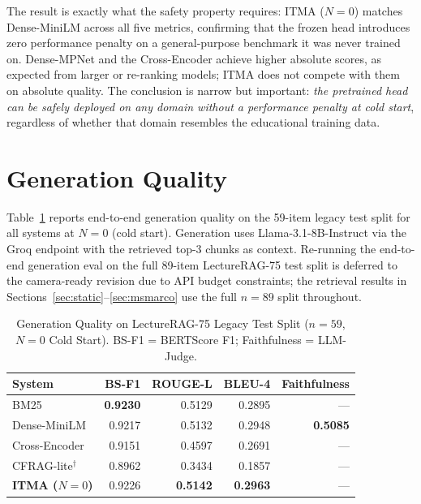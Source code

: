 \documentclass[journal]{IEEEtran}
\begin{document}
The result is exactly what the safety property requires: ITMA
($N{=}0$) matches Dense-MiniLM across all five metrics, confirming
that the frozen head introduces zero performance penalty on a
general-purpose benchmark it was never trained on.  Dense-MPNet and
the Cross-Encoder achieve higher absolute scores, as expected from
larger or re-ranking models; ITMA does not compete with them on
absolute quality.  The conclusion is narrow but important:
\emph{the pretrained head can be safely deployed on any domain without
a performance penalty at cold start}, regardless of whether that
domain resembles the educational training data.

\section{Generation Quality}
\label{sec:generation}

Table~\ref{tab:gen_quality} reports end-to-end generation quality on
the 59-item legacy test split for all systems at $N{=}0$ (cold start).
Generation uses Llama-3.1-8B-Instruct via the Groq endpoint with the
retrieved top-3 chunks as context.  Re-running the end-to-end generation
eval on the full 89-item LectureRAG-75 test split is deferred to the
camera-ready revision due to API budget constraints; the retrieval
results in Sections~\ref{sec:static}--\ref{sec:msmarco} use the full
$n{=}89$ split throughout.

\begin{table}[!htbp]
\centering
\caption{Generation Quality on LectureRAG-75 Legacy Test Split
($n{=}59$, $N{=}0$ Cold Start).  BS-F1 = BERTScore F1;
Faithfulness = LLM-Judge.}
\label{tab:gen_quality}
\small
\setlength{\tabcolsep}{4pt}
\begin{tabular}{lrrrr}
\toprule
System & BS-F1 & ROUGE-L & BLEU-4 & Faithfulness \\
\midrule
BM25 & \textbf{0.9230} & 0.5129 & 0.2895 & --- \\
Dense-MiniLM & 0.9217 & 0.5132 & 0.2948 & \textbf{0.5085} \\
Cross-Encoder & 0.9151 & 0.4597 & 0.2691 & --- \\
CFRAG-lite$^\dagger$ & 0.8962 & 0.3434 & 0.1857 & --- \\
\textbf{ITMA ($N{=}0$)} & 0.9226 & \textbf{0.5142} & \textbf{0.2963} & --- \\
\bottomrule
\end{tabular}
\end{table}
\end{document}
